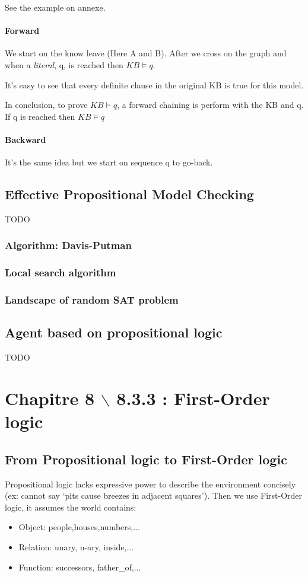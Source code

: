 See the example on annexe.

\paragraph{Forward}
We start on the know leave (Here A and B). After we cross on the graph 
and when a \textit{literal}, q,  is reached then $KB \models q$.

It's easy to see that every definite clause in the original KB is true
for this model.

In conclusion, to prove $KB \models q$, a forward chaining is perform
with the KB and q. If q is reached then $KB \models q$

\paragraph{Backward}
It's the same idea but we start on sequence q to go-back.


\subsection{Effective Propositional Model Checking}
TODO

\subsubsection{Algorithm: Davis-Putman}

\subsubsection{Local search algorithm}

\subsubsection{Landscape of random SAT problem}

\subsection{Agent based on propositional logic}
TODO

\section{Chapitre 8 $\backslash$ 8.3.3 : First-Order logic }
\subsection{From Propositional logic to First-Order logic}
	Propositional logic lacks expressive power to describe the environment 
	concisely (ex: cannot say `pits 	cause breezes in adjacent squares'). 
	Then we use First-Order logic, it assumes the world contains:
	\begin{itemize}
		\item Object: people,houses,numbers,...
		\item Relation: unary, n-ary, inside,...
		\item Function: successors, father\_of,...
	\end{itemize}

